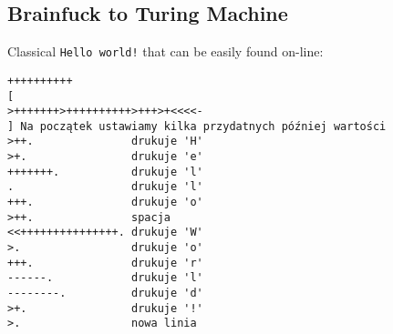 \documentclass[english,shortabstract,mgr]{iithesis}
\begin{document}
\subsection{Brainfuck to Turing Machine}

Classical \texttt{Hello world!} that can be easily found on-line:

\begin{verbatim}
++++++++++
[
>+++++++>++++++++++>+++>+<<<<-
] Na początek ustawiamy kilka przydatnych później wartości
>++.               drukuje 'H'
>+.                drukuje 'e'
+++++++.           drukuje 'l'
.                  drukuje 'l'
+++.               drukuje 'o'
>++.               spacja
<<+++++++++++++++. drukuje 'W'
>.                 drukuje 'o'
+++.               drukuje 'r'
------.            drukuje 'l'
--------.          drukuje 'd'
>+.                drukuje '!'
>.                 nowa linia
\end{verbatim}
\end{document}
